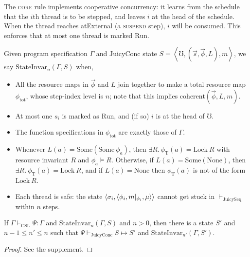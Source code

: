 The \textsc{core} rule implements cooperative concurrency: it learns
from the schedule that the $i$th thread is to be stepped, and leaves
$i$ at the head of the schedule.  When the thread reaches atExternal
(a \textsc{suspend} step), $i$ will be consumed. This enforces that at
most one thread is marked $\mathrm{Run}$.

\begin{definition}
\label{def:state-invariant}
  Given program specification $\Gamma$
  and JuicyConc state \linebreak
  $S=\left<\mho, (\vec{s},\vec{\phi}, L), m\right>$,
  we say $\mathrm{StateInvar}_n(\Gamma,S)$ when,
\begin{itemize}
\item All the resource maps in $\vec{\phi}$ and $L$ join together
  to make a total resource map $\phi_\mathrm{tot}$,
  whose step-index level is $n$; note that this implies $\mathrm{coherent}(\vec{\phi},L,m)$.
\item At most one $s_i$ is marked as $\mathrm{Run}$, and (if so) $i$ is at the head of $\mho$.
\item The function specifications in $\phi_\mathrm{tot}$ are
  exactly those of $\Gamma$.
\item Whenever $L(a)=\mathrm{Some}(\mathrm{Some}~\phi_a)$,
  then $\exists R.~\phi_\mathrm{T}(a)=\mathrm{Lock}~R$ with resource
  invariant $R$ and $\phi_a \models R$.  Otherwise, if
  $L(a)=\mathrm{Some}(\mathrm{None})$, then $\exists
  R.~\phi_\mathrm{T}(a)=\mathrm{Lock}~R$, and if $L(a)=\mathrm{None}$
  then $\phi_\mathrm{T}(a)$ is not of the form $\mathrm{Lock}~R$.
\item Each thread is safe:
  the state 
  $\left<\sigma_i,\left<\phi_i,m |_{\phi_i},\mu\right>\right>$ cannot get stuck in $\vdash_\mathrm{JuicySeq}$ within $n$ steps.%
\end{itemize}
\end{definition}
  
\begin{lemma}
\label{lem:juicy-conc-lemma}
If $\Gamma \vdash_\mathrm{CSL} \Psi:\Gamma$ and
$\mathrm{StateInvar}_n(\Gamma,S)$
and $n>0$, then there \linebreak is a state $S'$
and $n-1 \le n'\le n$
such that 
$\Psi \vdash_\mathrm{JuicyConc} S \mapsto S'$
and \linebreak $\mathrm{StateInvar}_{n'}(\Gamma,S')$.
\end{lemma}
\begin{proof} See the supplement.
\end{proof}

